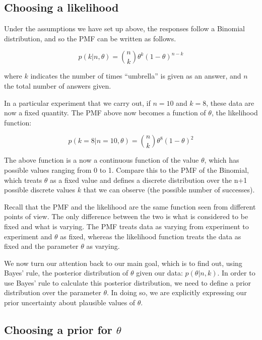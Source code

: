 \documentclass[12pt,]{krantz}
\theoremstyle{definition}
\theoremstyle{definition}
\theoremstyle{definition}
\theoremstyle{remark}
\begin{document}
\hypertarget{choosing-a-likelihood}{%
\subsection{Choosing a likelihood}\label{choosing-a-likelihood}}

Under the assumptions we have set up above, the responses follow a Binomial distribution, and so the PMF can be written as follows.

\begin{equation}
p(k|n,\theta) = \binom{n}
{k} \theta^k (1-\theta)^{n-k}
\label{eq:binom}
\end{equation}

where \(k\) indicates the number of times ``umbrella'' is given as an answer, and \(n\) the total number of answers given.

In a particular experiment that we carry out, if \(n=10\) and \(k = 8\), these data are now a fixed quantity. The PMF above now becomes a function of \(\theta\), the likelihood function:

\begin{equation}
p(k=8 | n= 10, \theta) = \binom{n}{k} \theta^8 (1-\theta)^{2}
\end{equation}

The above function is a now a continuous function of the value \(\theta\), which has possible values ranging from 0 to 1. Compare this to the PMF of the Binomial, which treats \(\theta\) as a fixed value and defines a discrete distribution over the n+1 possible discrete values \(k\) that we can observe (the possible number of successes).

Recall that the PMF and the likelihood are the same function seen from different points of view. The only difference between the two is what is considered to be fixed and what is varying. The PMF treats data as varying from experiment to experiment and \(\theta\) as fixed, whereas the likelihood function treats the data as fixed and the parameter \(\theta\) as varying.

We now turn our attention back to our main goal, which is to find out, using Bayes' rule, the posterior distribution of \(\theta\) given our data: \(p(\theta|n,k)\). In order to use Bayes' rule to calculate this posterior distribution, we need to define a prior distribution over the parameter \(\theta\). In doing so, we are explicitly expressing our prior uncertainty about plausible values of \(\theta\).

\hypertarget{sec:choosepriortheta}{%
\subsection{\texorpdfstring{Choosing a prior for \(\theta\)}{Choosing a prior for \textbackslash{}theta}}\label{sec:choosepriortheta}}
\end{document}
